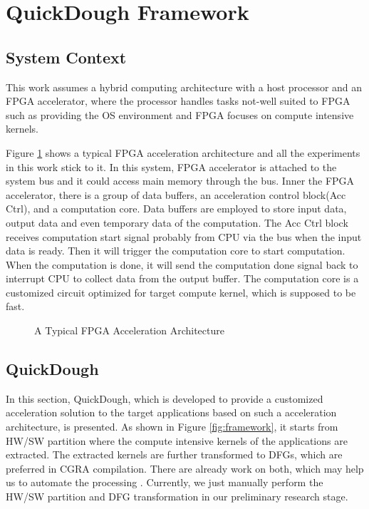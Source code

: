 \section{QuickDough Framework}\label{sec:framework}

\subsection{System Context}
This work assumes a hybrid computing architecture with a host processor and an FPGA accelerator, where the processor handles tasks not-well suited to FPGA such as providing the OS environment and FPGA focuses on compute intensive kernels.

Figure \ref{fig:typical-FPGA-accelerator} shows a typical FPGA acceleration architecture and all the experiments in this work stick to it. In this system, FPGA accelerator is attached to the system bus and it could access main memory through the bus. Inner the FPGA accelerator, there is a group of data buffers, an acceleration control block(Acc Ctrl), and a computation core. Data buffers are employed to store input data, output data and even temporary data of the computation. The Acc Ctrl block receives computation start signal probably from CPU via the bus when the input data is ready. Then it will trigger the computation core to start computation. When the computation is done, it will send the computation done signal back to interrupt CPU to collect data from the output buffer. The computation core is a customized circuit optimized for target compute kernel, which is supposed to be fast.  

\begin{figure}[H]
    \caption{A Typical FPGA Acceleration Architecture}
    \label{fig:typical-FPGA-accelerator}
\end{figure}

\subsection{QuickDough}
In this section, QuickDough, which is developed to provide a customized acceleration solution to the target applications based on such a acceleration architecture, is presented. As shown in Figure \ref{fig:framework}, it starts from HW/SW partition where the compute intensive kernels of the applications are extracted. The extracted kernels are further transformed to DFGs, which are preferred in CGRA compilation. There are already work on both, which may help us to automate the processing \cite{Baleani2002HW-SW} \cite{ROCCC}. Currently, we just manually perform the HW/SW partition and DFG transformation in our preliminary research stage. 

